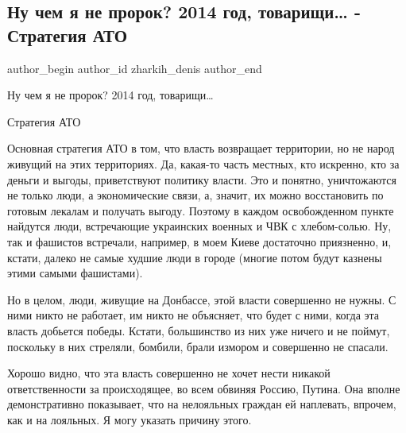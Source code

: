  
 
 
 
 
 
\subsection{Ну чем я не пророк? 2014 год, товарищи… - Стратегия АТО}
\label{sec:28_07_2021.fb.zharkih_denis.1.strategia_ato}
 
\ifcmt
 author_begin
   author_id zharkih_denis
 author_end
\fi

Ну чем я не пророк? 2014 год, товарищи…

Стратегия АТО

Основная стратегия АТО в том, что власть возвращает территории, но не народ
живущий на этих территориях. Да, какая-то часть местных, кто искренно, кто за
деньги и выгоды, приветствуют политику власти. Это и понятно, уничтожаются не
только люди, а экономические связи, а, значит, их можно восстановить по готовым
лекалам и получать выгоду. Поэтому в каждом освобожденном пункте найдутся люди,
встречающие украинских военных и ЧВК с хлебом-солью. Ну, так и фашистов
встречали, например, в моем Киеве достаточно приязненно, и, кстати, далеко не
самые худшие люди в городе (многие потом будут казнены этими самыми фашистами). 

Но в целом, люди, живущие на Донбассе, этой власти совершенно не нужны. С ними
никто не работает, им никто не объясняет, что будет с ними, когда эта власть
добьется победы. Кстати, большинство из них уже ничего и не поймут, поскольку в
них стреляли, бомбили, брали измором и совершенно не спасали.

Хорошо видно, что эта власть совершенно не хочет нести никакой ответственности
за происходящее, во  всем обвиняя Россию, Путина. Она вполне демонстративно
показывает, что на нелояльных граждан ей наплевать, впрочем, как и на лояльных.
Я могу указать причину этого.

